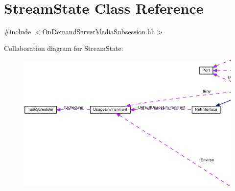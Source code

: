 \section{Stream\+State Class Reference}
\label{classStreamState}


{\ttfamily \#include $<$On\+Demand\+Server\+Media\+Subsession.\+hh$>$}



Collaboration diagram for Stream\+State\+:
\nopagebreak
\begin{figure}[H]
\begin{center}
\leavevmode
\includegraphics[width=350pt]{classStreamState__coll__graph}
\end{center}
\end{figure}
